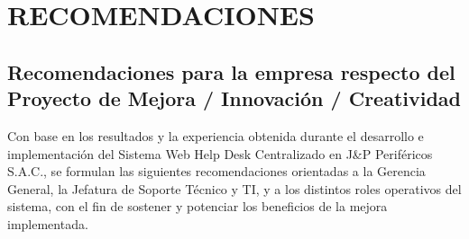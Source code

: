 \chapter[CAPÍTULO VIII]{RECOMENDACIONES}

\section{Recomendaciones para la empresa respecto del Proyecto de Mejora / Innovación / Creatividad}

Con base en los resultados y la experiencia obtenida durante el desarrollo e implementación del Sistema Web Help Desk Centralizado en J\&P Periféricos S.A.C., se formulan las siguientes recomendaciones orientadas a la Gerencia General, la Jefatura de Soporte Técnico y TI, y a los distintos roles operativos del sistema, con el fin de sostener y potenciar los beneficios de la mejora implementada.

